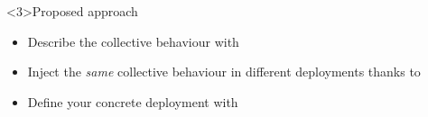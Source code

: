 \begin{frame}<3>{Proposed approach}
  \begin{cardTiny}
    \begin{itemize}
      \item<1-> Describe the collective behaviour with ~
      \item<2-> Inject the \textit{same} collective behaviour in different deployments thanks to ~
      \item<3-> Define your concrete deployment with ~
    \end{itemize}
  \end{cardTiny}
  \begin{columns}[onlytextwidth, b]
    \begin{column}{0.22\textwidth}
      \begin{adjustbox}{max width=\textwidth, valign=m, margin=0}
      \end{adjustbox}
    \end{column}
    \begin{column}{0.27\textwidth}
      \begin{adjustbox}{max width=\textwidth, valign=m}
      \end{adjustbox}
    \end{column}
    \begin{column}{0.2\textwidth}
      \begin{adjustbox}{max width=\textwidth, valign=m}
      \end{adjustbox}
    \end{column}
  \end{columns}
\end{frame}